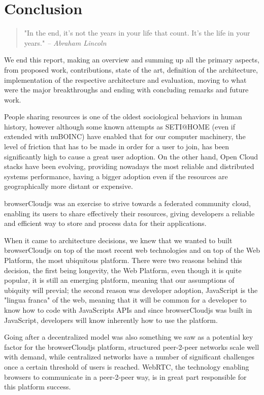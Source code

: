 \chapter{Conclusion}\label{ch:conclusion}

\begin{quotation}
  "In the end, it's not the years in your life that count. It's the life in your years."
  {\small\it -- Abraham Lincoln}
\end{quotation}

We end this report, making an overview and summing up all the primary aspects, from proposed work, contributions, state of the art, definition of the architecture, implementation of the respective architecture and evaluation, moving to what were the major breakthroughs and ending with concluding remarks and future work.

People sharing resources is one of the oldest sociological behaviors in human history, however although some known attempts as SETI@HOME (even if extended with nuBOINC) have enabled that for our computer machinery, the level of friction that has to be made in order for a user to join, has been significantly high to cause a great user adoption. On the other hand, Open Cloud stacks have been evolving, providing nowadays the most reliable and distributed systems performance, having a bigger adoption even if the resources are geographically more distant or expensive.

browserCloudjs was an exercise to strive towards a federated community cloud, enabling its users to share effectively their resources, giving developers a reliable and efficient way to store and process data for their applications.

When it came to architecture decisions, we knew that we wanted to built browserCloudjs on top of the most recent web technologies and on top of the Web Platform, the most ubiquitous platform. There were two reasons behind this decision, the first being longevity, the Web Platform, even though it is quite popular, it is still an emerging platform, meaning that our assumptions of ubiquity will previal; the second reason was developer adoption, JavaScript is the "lingua franca" of the web, meaning that it will be common for a developer to know how to code with JavaScripts APIs and since browserCloudjs was built in JavaScript, developers will know inherently how to use the platform.

Going after a decentralized model was also something we saw as a potential key factor for the browserCloudjs platform, structured peer-2-peer networks scale well with demand, while centralized networks have a number of significant challenges once a certain threshold of users is reached. WebRTC, the technology enabling browsers to communicate in a peer-2-peer way, is in great part responsible for this platform success.

